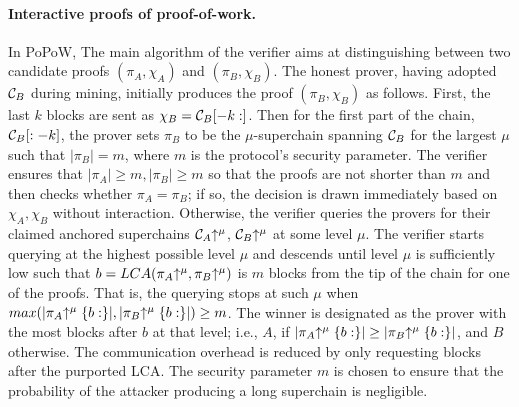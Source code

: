 \paragraph{Interactive proofs of proof-of-work.}
In PoPoW, The main algorithm of the
verifier aims at distinguishing between two candidate proofs $(\pi_A, \chi_A)$
and $(\pi_B, \chi_B)$. The honest prover, having adopted $\mathcal{C}_B$ during
mining, initially produces the proof $(\pi_B, \chi_B)$ as follows. First, the
last $k$ blocks are sent as $\chi_B = \mathcal{C}_B[-k:]$. Then for the
first part of the chain, $\mathcal{C}_B[:-k]$, the prover sets $\pi_B$ to be the
$\mu$-superchain spanning $\mathcal{C}_B$ for the largest $\mu$ such that $|\pi_B| =
m$, where $m$ is the protocol's security parameter. The verifier ensures that
$|\pi_A| \geq m, |\pi_B| \geq m$ so that the proofs are not shorter than $m$ and
then checks whether $\pi_A = \pi_B$; if so, the decision is drawn immediately
based on $\chi_A,\chi_B$ without interaction. Otherwise, the verifier queries
the provers for their claimed anchored superchains $\mathcal{C}_A\negthickspace\uparrow^\mu$,
$\mathcal{C}_B\negthickspace\uparrow^\mu$ at some level $\mu$. The verifier starts querying at the
highest possible level $\mu$ and descends until level $\mu$ is sufficiently low
such that $b = LCA(\pi_A\negthickspace\uparrow^\mu, \pi_B\negthickspace\uparrow^\mu)$ is $m$ blocks from the
tip of the chain for one of the proofs. That is, the querying stops at such
$\mu$ when $max(|\pi_A\negthickspace\uparrow^\mu\{b:\}|, |\pi_B\negthickspace\uparrow^\mu\{b:\}|) \geq m$.
The winner is designated as the prover with the most blocks after $b$ at that
level; i.e., $A$, if $|\pi_A\negthickspace\uparrow^\mu\{b:\}| \geq |\pi_B\negthickspace\uparrow^\mu\{b:\}|$,
and $B$ otherwise. The communication overhead is reduced by only requesting
blocks after the purported LCA. The security parameter $m$ is chosen to ensure
that the probability of the attacker
producing a long superchain is negligible.

